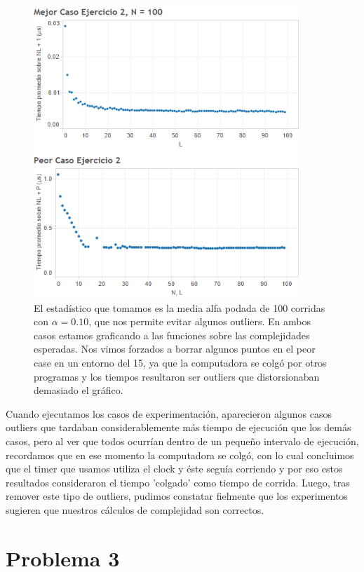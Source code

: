 \documentclass{article}
\theoremstyle{definition}
\theoremstyle{remark}
\begin{document}
\pagebreak

\begin{figure}
\centering
\includegraphics[width=10cm]{ex2}
\caption{El estadístico que tomamos es la media alfa podada de 100 corridas con $\alpha = 0.10$, que nos permite evitar algunos outliers. En ambos casos estamos graficando a las funciones sobre las complejidades esperadas. Nos vimos forzados a borrar algunos puntos en el peor case en un entorno del 15, ya que la computadora se colgó por otros programas y los tiempos resultaron ser outliers que distorsionaban demasiado el gráfico.\label{grf:ex2}}
\end{figure}

Cuando ejecutamos los casos de experimentación, aparecieron algunos casos outliers que tardaban considerablemente más tiempo de ejecución que los demás casos, pero al ver que todos ocurrían dentro de un pequeño intervalo de ejecución, recordamos que en ese momento la computadora se colgó, con lo cual concluimos que el timer que usamos utiliza el clock y éste seguía corriendo y por eso estos resultados consideraron el tiempo 'colgado' como tiempo de corrida. Luego, tras remover este tipo de outliers, pudimos constatar fielmente que los experimentos sugieren que nuestros cálculos de complejidad son correctos.

\pagebreak

\section{Problema 3}
\end{document}
